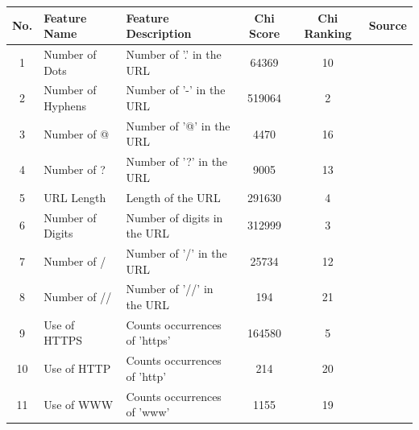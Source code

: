 \documentclass{article}
\begin{document}
    \begin{table}[h]
        \centering
        \begin{tabular}{|c|l|p{6cm}|c|c|l|}
            \hline
            \textbf{No.} & \textbf{Feature Name} & \textbf{Feature Description}                 & \textbf{Chi Score} & \textbf{Chi Ranking} & \textbf{Source} \\ \hline
            1            & Number of Dots        & Number of '.' in the URL                     & 64369              & 10                   &                 \\ \hline
            2            & Number of Hyphens     & Number of '-' in the URL                     & 519064             & 2                    &                 \\ \hline
            3            & Number of @           & Number of '@' in the URL                     & 4470               & 16                   &                 \\ \hline
            4            & Number of ?           & Number of '?' in the URL                     & 9005               & 13                   &                 \\ \hline
            5            & URL Length            & Length of the URL                            & 291630             & 4                    &                 \\ \hline
            6            & Number of Digits      & Number of digits in the URL                  & 312999             & 3                    &                 \\ \hline
            7            & Number of /           & Number of '/' in the URL                     & 25734              & 12                   &                 \\ \hline
            8            & Number of //          & Number of '//' in the URL                    & 194                & 21                   &                 \\ \hline
            9            & Use of HTTPS          & Counts occurrences of 'https'                & 164580             & 5                    &                 \\ \hline
            10           & Use of HTTP           & Counts occurrences of 'http'                 & 214                & 20                   &                 \\ \hline
            11           & Use of WWW            & Counts occurrences of 'www'                  & 1155               & 19                   &                 \\ \hline

\end{tabular}
\end{table}
\end{document}

